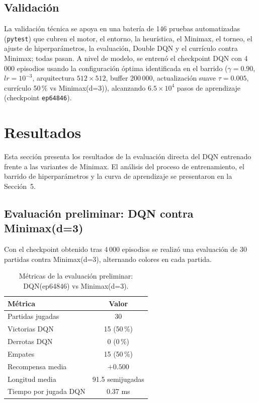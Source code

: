 \documentclass[11pt,a4paper]{article}
\begin{document}
\subsection{Validación}

La validación técnica se apoya en una batería de 146 pruebas automatizadas (\texttt{pytest}) que cubren el motor, el entorno, la heurística, el Minimax, el torneo, el ajuste de hiperparámetros, la evaluación, Double DQN y el currículo contra Minimax; todas pasan. A nivel de modelo, se entrenó el checkpoint DQN con 4\,000 episodios usando la configuración óptima identificada en el barrido ($\gamma=0.90$, $lr=10^{-3}$, arquitectura $512\times512$, buffer 200\,000, actualización suave $\tau=0.005$, currículo 50\,\% vs Minimax(d=3)), alcanzando $6.5\times10^{4}$ pasos de aprendizaje (checkpoint \texttt{ep64846}).

\section{Resultados}

Esta sección presenta los resultados de la evaluación directa del DQN entrenado frente a las variantes de Minimax. El análisis del proceso de entrenamiento, el barrido de hiperparámetros y la curva de aprendizaje se presentaron en la Sección~5.

\subsection{Evaluación preliminar: DQN contra Minimax(d=3)}

Con el checkpoint obtenido tras 4\,000 episodios se realizó una evaluación de 30 partidas contra Minimax(d=3), alternando colores en cada partida.

\begin{table}[H]
\centering
\caption{Métricas de la evaluación preliminar: DQN(ep64846) vs Minimax(d=3).}
\begin{tabular}{lc}
\toprule
Métrica & Valor \\
\midrule
Partidas jugadas      & 30 \\
Victorias DQN         & 15 \hspace{0.5em} (50\,\%) \\
Derrotas DQN          & 0 \hspace{0.5em} (0\,\%) \\
Empates               & 15 \hspace{0.5em} (50\,\%) \\
Recompensa media      & $+0.500$ \\
Longitud media        & 91.5 semijugadas \\
Tiempo por jugada DQN & 0.37 ms \\
\bottomrule
\end{tabular}
\end{table}
\end{document}
